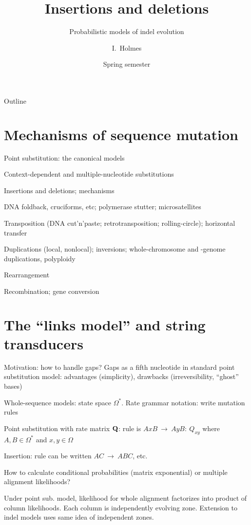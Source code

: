 \documentclass{beamer}
\title[Indels] %
{Insertions and deletions}
\subtitle
{Probabilistic models of indel evolution} %
\author%
{I.~Holmes} %
\institute[University of California, Berkeley] %
{
  Department of Bioengineering\\
  University of California, Berkeley}
\date%
{Spring semester}
\begin{document}
\begin{frame}
  \titlepage
\end{frame}

\begin{frame}{Outline}
  \tableofcontents
\end{frame}


\section{Mechanisms of sequence mutation}

\begin{frame}{}

\itemb
\item Point substitution: the canonical models
\item Context-dependent and multiple-nucleotide substitutions
\item Insertions and deletions; mechanisms
 \itemb
 \item DNA foldback, cruciforms, etc; polymerase stutter; microsatellites
 \item Transposition (DNA cut'n'paste; retrotransposition; rolling-circle); horizontal transfer
 \iteme
\item Duplications (local, nonlocal); inversions; whole-chromosome and -genome duplications, polyploidy
\item Rearrangement
\item Recombination; gene conversion
\iteme

\end{frame}

\section{The ``links model'' and string transducers}

\begin{frame}{}

\itemb
\item Motivation: how to handle gaps? Gaps as a fifth nucleotide in standard point substitution model: advantages (simplicity), drawbacks (irreversibility, ``ghost'' bases)
\item Whole-sequence models: state space $\Omega^\ast$. Rate grammar notation: write mutation rules
 \itemb
 \item Point substitution with rate matrix ${\bf Q}$: rule is $AxB\ \to\ AyB:\ Q_{xy}$ where $A,B \in \Omega^\ast$ and $x,y \in \Omega$
 \item Insertion: rule can be written $AC\ \to\ ABC$, etc.
 \iteme
\item How to calculate conditional probabilities (matrix exponential) or multiple alignment likelihoods?
\item Under point sub. model, likelihood for whole alignment factorizes into product of column likelihoods.
Each column is independently evolving zone. Extension to indel models uses same idea of independent zones.
\iteme
\end{frame}
\end{document}
